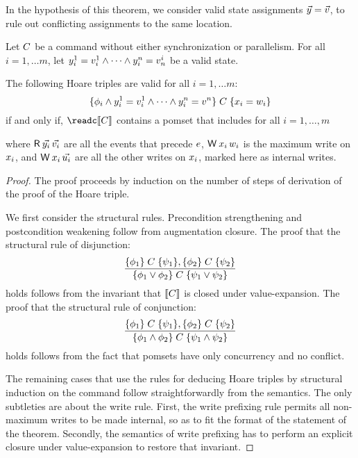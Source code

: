 In the hypothesis of this theorem, we consider valid state assignments $\vec{y} =\vec{v}$, to rule out conflicting assignments to the same location.  
\begin{theorem}\label{hoareGen}
Let $C$ be a command without either synchronization or parallelism.   For all $i=1, \ldots m$, let $y^1_i=v^1_i\land\cdots\land y^n_i=v^i_n$ be a valid state. 

The following Hoare triples are valid for all $i=1, \ldots m$:
\begin{displaymath}
  \{\phi_i\land y^1_i=v^1_i\land\cdots\land y^n_i=v^n\}\allowbreak\;C\;\allowbreak\{x_i=w_i\}  
\end{displaymath}
if and only if, $\readc\sem{\aCmd}$ contains a pomset  that includes for all $i=1, \ldots, m$
\begin{tikzdisplay}[node distance=1em]
\end{tikzdisplay}
where $\DR{\vec{\bLoc_i}}{\vec{\aVal_i}}$ are all the events that precede $e$, $\DW{\aLoc_i}{\bVal_i}$ is the maximum write on $x_i$,  and
$\DW{\aLoc_i}{\vec{\dVal_i}}$ are all the other writes on $x_i$, marked here as internal writes.
\begin{proof}
The proof proceeds by induction on the number of steps of derivation of the proof of the Hoare triple.  

We first consider the structural rules.  Precondition strengthening and postcondition weakening follow from augmentation closure.    
The proof that the structural rule of disjunction:
\[ \frac{\{\phi_1\}\allowbreak\;C\;\allowbreak\{\psi_1\},  \{\phi_2\}\allowbreak\;C\;\allowbreak\{\psi_2\}}{ \{\phi_1 \lor \phi_2\}\allowbreak\;C\;\allowbreak\{\psi_1\lor \psi_2\}} 
\]
holds  follows from the invariant that  $\llbracket C\rrbracket$ is closed under value-expansion.    The proof that the structural rule of conjunction:
\[ \frac{\{\phi_1\}\allowbreak\;C\;\allowbreak\{\psi_1\},  \{\phi_2\}\allowbreak\;C\;\allowbreak\{\psi_2\}}{ \{\phi_1 \land \phi_2\}\allowbreak\;C\;\allowbreak\{\psi_1\land \psi_2\}} 
\]
holds follows from the fact that pomsets have only concurrency and no conflict.  

The remaining cases that use the rules for deducing Hoare triples by structural induction on the command follow straightforwardly from the semantics.    The only subtleties are about the write rule.  First, the write prefixing rule permits all non-maximum writes to be made internal, so as to fit the format of the statement of the theorem.  Secondly, the semantics of write prefixing has to perform  an explicit closure under value-expansion to restore that invariant.  
\end{proof}
\end{theorem}



